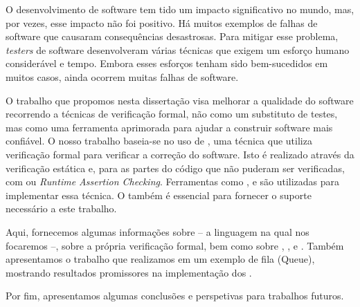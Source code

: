 

O desenvolvimento de software tem tido um impacto significativo no mundo, mas, por vezes, esse 
impacto não foi positivo. Há muitos exemplos de falhas de software que causaram consequências 
desastrosas. Para mitigar esse problema, \textit{testers} de software desenvolveram várias técnicas 
que exigem um esforço humano considerável e tempo. Embora esses esforços tenham sido 
bem-sucedidos em muitos casos, ainda ocorrem muitas falhas de software.

O trabalho que propomos nesta dissertação visa melhorar a qualidade do software recorrendo 
a técnicas de verificação formal, não como um substituto de testes, mas como uma ferramenta 
aprimorada para ajudar a construir software mais confiável. O nosso trabalho baseia-se no 
uso de \monitors, uma técnica que utiliza verificação formal para verificar a correção do 
software. Isto é realizado através da verificação estática e, para as partes do código que 
não puderam ser verificadas, com \rac ou \textit{Runtime Assertion Checking}. 
Ferramentas como \gospellang, \ortac e \cameleer são utilizadas para implementar essa 
técnica. O \why também é essencial para fornecer o suporte necessário a este trabalho.

Aqui, fornecemos algumas informações sobre \ocaml – a linguagem na qual nos focaremos –, 
sobre a própria verificação formal, bem como sobre \gospellang, \ortac, \cameleer e \why. Também 
apresentamos o trabalho que realizamos em um exemplo de fila (Queue), mostrando resultados 
promissores na implementação dos \monitors.

Por fim, apresentamos algumas conclusões e perspetivas para trabalhos futuros.

